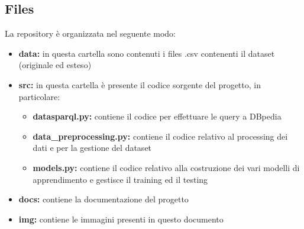 \documentclass{article}
\begin{document}
\subsection{Files}
La repository è organizzata nel seguente modo:
\begin{itemize}
	\itemsep0em
	\item \textbf{data:} in questa cartella sono contenuti i files .csv 
		contenenti il dataset (originale ed esteso)
	\item \textbf{src:} in questa cartella è presente il codice sorgente del
		progetto, in particolare:
		\begin{itemize}
		\itemsep0em
			\item \textbf{datasparql.py:} contiene il codice per effettuare le
				query a DBpedia
			\item \textbf{data\_preprocessing.py:} contiene il codice relativo
				al processing dei dati e per la gestione del dataset
			\item \textbf{models.py:} contiene il codice relativo alla
				costruzione dei vari modelli di apprendimento e gestisce il
				training ed il testing
		\end{itemize}
	\item \textbf{docs:} contiene la documentazione del progetto
	\item \textbf{img:} contiene le immagini presenti in questo documento
\end{itemize}
\end{document}

